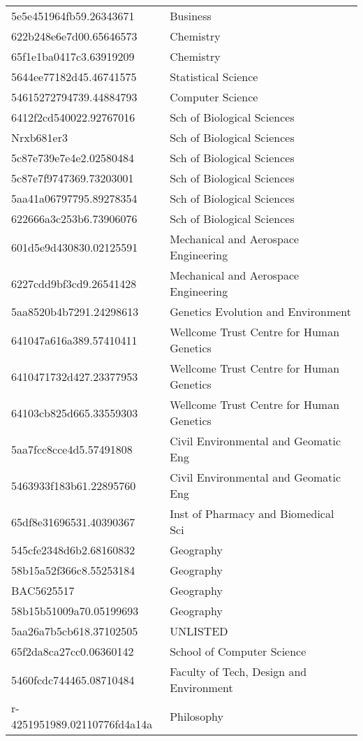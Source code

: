 \begin{tabular}{ll}
5e5e451964fb59.26343671 & Business \\
622b248e6e7d00.65646573 & Chemistry \\
65f1e1ba0417c3.63919209 & Chemistry \\
5644ee77182d45.46741575 & Statistical Science \\
54615272794739.44884793 & Computer Science \\
6412f2cd540022.92767016 & Sch of Biological Sciences \\
Nrxb681er3 & Sch of Biological Sciences \\
5c87e739e7e4e2.02580484 & Sch of Biological Sciences \\
5c87e7f9747369.73203001 & Sch of Biological Sciences \\
5aa41a06797795.89278354 & Sch of Biological Sciences \\
622666a3c253b6.73906076 & Sch of Biological Sciences \\
601d5e9d430830.02125591 & Mechanical and Aerospace Engineering \\
6227cdd9bf3cd9.26541428 & Mechanical and Aerospace Engineering \\
5aa8520b4b7291.24298613 & Genetics Evolution and Environment \\
641047a616a389.57410411 & Wellcome Trust Centre for Human Genetics \\
6410471732d427.23377953 & Wellcome Trust Centre for Human Genetics \\
64103cb825d665.33559303 & Wellcome Trust Centre for Human Genetics \\
5aa7fcc8cce4d5.57491808 & Civil Environmental and Geomatic Eng \\
5463933f183b61.22895760 & Civil Environmental and Geomatic Eng \\
65df8e31696531.40390367 & Inst of Pharmacy and Biomedical Sci \\
545cfe2348d6b2.68160832 & Geography \\
58b15a52f366c8.55253184 & Geography \\
BAC5625517 & Geography \\
58b15b51009a70.05199693 & Geography \\
5aa26a7b5cb618.37102505 & UNLISTED \\
65f2da8ca27cc0.06360142 & School of Computer Science \\
5460fcdc744465.08710484 & Faculty of Tech, Design and Environment \\
r-4251951989.02110776fd4a14a & Philosophy \\

\end{tabular}

